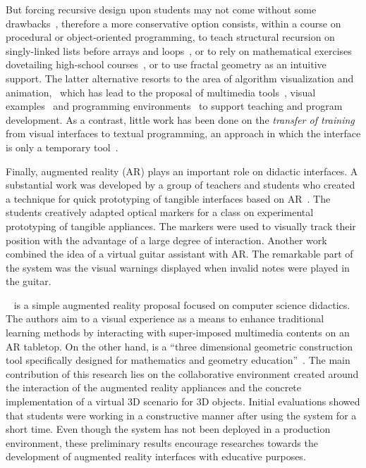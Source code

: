 But forcing recursive design upon students may not come without some
drawbacks~\cite{Segal:1994,ClakMyers:1995}, therefore a more
conservative option consists, within a course on procedural or
object\hyp{}oriented programming, to teach structural recursion on
singly\hyp{}linked lists before arrays and
loops~\cite{TurbakRoydenStephanHerbst:1999}, or to rely on
mathematical exercises dovetailing high\hyp{}school
courses~\cite{RubioHernan:2007}, or to use fractal geometry as an
intuitive support. The latter alternative resorts to the area of
algorithm visualization and animation,~\cite{WilcoksSanders:1994}
which has lead to the proposal of multimedia
tools~\cite{Rosenthal:2005}, visual
examples~\cite{Stephenson:2009a,WuLeeMei:1998} and programming
environments~\cite{Kelso:2002} to support teaching and program
development. As a contrast, little work has been done on the
\emph{transfer of training} from visual interfaces to textual
programming, an approach in which the interface is only a temporary
tool~\cite{HundhausenFarleyBrown:2009}.

Finally, augmented reality (AR) plays an important role on didactic
interfaces. A substantial work was developed by a group of teachers
and students who created a technique for quick prototyping of tangible
interfaces based on AR~\cite{HorneckerPsik:2005}. The students
creatively adapted optical \artoolkit markers for a class on
experimental prototyping of tangible appliances. The markers were used
to visually track their position with the advantage of a large degree
of interaction. Another work~\cite{Billinghurst:2002} combined the
idea of a virtual guitar assistant with AR. The remarkable part of the
system was the visual warnings displayed when invalid notes were
played in the guitar.

\MARIE~\cite{LPLW:2002} is a simple augmented reality proposal focused
on computer science didactics. The authors aim to a visual experience
as a means to enhance traditional learning methods by interacting with
super\hyp{}imposed multimedia contents on an AR tabletop. On the other
hand, \ConstructD is a ``three dimensional geometric construction
tool specifically designed for mathematics and geometry
education''~\cite{KaufmannSchmalstieg:2002}. The main contribution of
this research lies on the collaborative environment created around the
interaction of the augmented reality appliances and the concrete
implementation of a virtual 3D scenario for 3D objects. Initial
evaluations showed that students were working in a constructive manner
after using the system for a short time. Even though the system has
not been deployed in a production environment, these preliminary
results encourage researches towards the development of augmented
reality interfaces with educative purposes.

